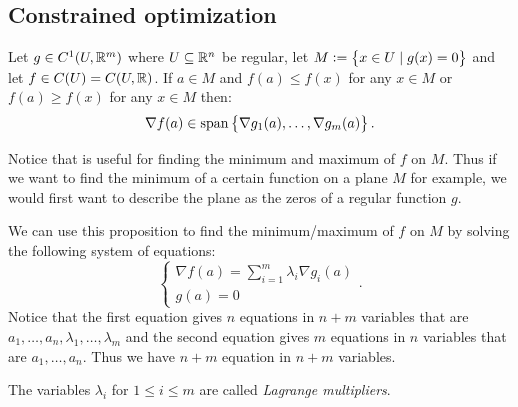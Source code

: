\documentclass[11pt,a4paper]{article}
\begin{document}
\subsection{Constrained optimization}
\begin{proposition}
  \label{prop:lagrange}
  Let $g \in C^1(U,\mathbb{R}^m)$ where $U \subseteq \mathbb{R}^n$ be regular,
  let $M := \left\{x \in U \mid g(x) = 0\right\}$
  and let $f \in C(U) = C(U,\mathbb{R})$.
  If $a \in M$ and $f(a) \le f(x)$ for any $x \in M$
  or $f(a) \geq f(x)$ for any $x \in M$ then:
  \[
    \nabla f(a) \in \operatorname{span}\left\{\nabla g_1(a),\dots,\nabla g_m(a)\right\}.
  \]
\end{proposition}

\begin{remark}
  Notice that  is useful for finding
  the minimum and maximum of $f$ on $M$.
  Thus if we want to find the minimum of a certain function
  on a plane $M$ for example, we would first want to describe
  the plane as the zeros of a regular function $g$.
\end{remark}

\begin{remark}
  \label{rmk:lagrange-equations}
  We can use this proposition to find the minimum/maximum of $f$ on $M$
  by solving the following system of equations:
  \[
    \begin{cases}
      \nabla f(a) = \sum_{i = 1}^{m}{\lambda_i \nabla g_i(a)} \\
      g(a) = 0
    \end{cases}.
  \]
  Notice that the first equation gives $n$ equations in $n + m$ variables
  that are $a_1,\dots,a_n,\lambda_1,\dots,\lambda_m$ and the second
  equation gives $m$ equations in $n$ variables that are $a_1,\dots,a_n$.
  Thus we have $n + m$ equation in $n + m$ variables.
\end{remark}

\begin{remark}
  The variables $\lambda_i$ for $1 \le i \le m$ are called
  \textit{Lagrange multipliers}.
\end{remark}
\end{document}
